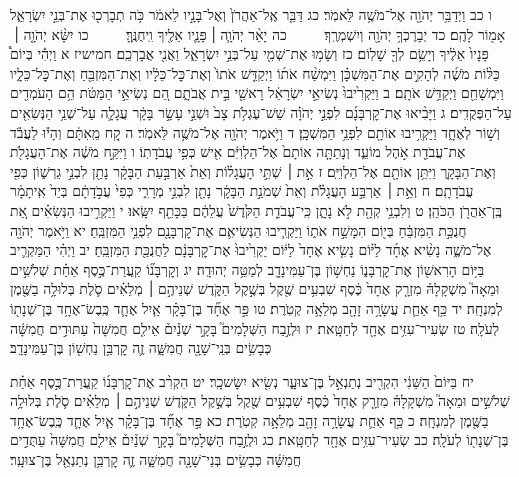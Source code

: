 \documentclass[twoside, openany, parskip=half, 11pt]{book}
\begin{document}
ו כב וַיְדַבֵּ֥ר יְהֹוָ֖ה אֶל־מֹשֶׁ֥ה לֵּאמֹֽר׃ כג דַּבֵּ֤ר אֶֽל־אַהֲרֹן֙ וְאֶל־בָּנָ֣יו לֵאמֹ֔ר כֹּ֥ה תְבָרְכ֖וּ אֶת־בְּנֵ֣י יִשְׂרָאֵ֑ל אָמ֖וֹר לָהֶֽם׃
כד יְבָרֶכְךָ֥ יְהֹוָ֖ה וְיִשְׁמְרֶֽךָ׃    כה יָאֵ֨ר יְהֹוָ֧ה ׀ פָּנָ֛יו אֵלֶ֖יךָ וִֽיחֻנֶּֽךָּ׃    כו יִשָּׂ֨א יְהֹוָ֤ה ׀ פָּנָיו֙ אֵלֶ֔יךָ וְיָשֵׂ֥ם לְךָ֖ שָׁלֽוֹם׃
כז וְשָׂמ֥וּ אֶת־שְׁמִ֖י עַל־בְּנֵ֣י יִשְׂרָאֵ֑ל וַאֲנִ֖י אֲבָרְכֵֽם׃
חמישיז א וַיְהִ֡י בְּיוֹם֩ כַּלּ֨וֹת מֹשֶׁ֜ה לְהָקִ֣ים אֶת־הַמִּשְׁכָּ֗ן וַיִּמְשַׁ֨ח אֹת֜וֹ וַיְקַדֵּ֤שׁ אֹתוֹ֙ וְאֶת־כׇּל־כֵּלָ֔יו וְאֶת־הַמִּזְבֵּ֖חַ וְאֶת־כׇּל־כֵּלָ֑יו וַיִּמְשָׁחֵ֖ם וַיְקַדֵּ֥שׁ אֹתָֽם׃ ב וַיַּקְרִ֙יבוּ֙ נְשִׂיאֵ֣י יִשְׂרָאֵ֔ל רָאשֵׁ֖י בֵּ֣ית אֲבֹתָ֑ם הֵ֚ם נְשִׂיאֵ֣י הַמַּטֹּ֔ת הֵ֥ם הָעֹמְדִ֖ים עַל־הַפְּקֻדִֽים׃ ג וַיָּבִ֨יאוּ אֶת־קׇרְבָּנָ֜ם לִפְנֵ֣י יְהֹוָ֗ה שֵׁשׁ־עֶגְלֹ֥ת צָב֙ וּשְׁנֵ֣י עָשָׂ֣ר בָּקָ֔ר עֲגָלָ֛ה עַל־שְׁנֵ֥י הַנְּשִׂאִ֖ים וְשׁ֣וֹר לְאֶחָ֑ד וַיַּקְרִ֥יבוּ אוֹתָ֖ם לִפְנֵ֥י הַמִּשְׁכָּֽן׃ ד וַיֹּ֥אמֶר יְהֹוָ֖ה אֶל־מֹשֶׁ֥ה לֵּאמֹֽר׃ ה קַ֚ח מֵֽאִתָּ֔ם וְהָי֕וּ לַעֲבֹ֕ד אֶת־עֲבֹדַ֖ת אֹ֣הֶל מוֹעֵ֑ד וְנָתַתָּ֤ה אוֹתָם֙ אֶל־הַלְוִיִּ֔ם אִ֖ישׁ כְּפִ֥י עֲבֹדָתֽוֹ׃ ו וַיִּקַּ֣ח מֹשֶׁ֔ה אֶת־הָעֲגָלֹ֖ת וְאֶת־הַבָּקָ֑ר וַיִּתֵּ֥ן אוֹתָ֖ם אֶל־הַלְוִיִּֽם׃ ז אֵ֣ת ׀ שְׁתֵּ֣י הָעֲגָל֗וֹת וְאֵת֙ אַרְבַּ֣עַת הַבָּקָ֔ר נָתַ֖ן לִבְנֵ֣י גֵרְשׁ֑וֹן כְּפִ֖י עֲבֹדָתָֽם׃ ח וְאֵ֣ת ׀ אַרְבַּ֣ע הָעֲגָלֹ֗ת וְאֵת֙ שְׁמֹנַ֣ת הַבָּקָ֔ר נָתַ֖ן לִבְנֵ֣י מְרָרִ֑י כְּפִי֙ עֲבֹ֣דָתָ֔ם בְּיַד֙ אִֽיתָמָ֔ר בֶּֽן־אַהֲרֹ֖ן הַכֹּהֵֽן׃ ט וְלִבְנֵ֥י קְהָ֖ת לֹ֣א נָתָ֑ן כִּֽי־עֲבֹדַ֤ת הַקֹּ֙דֶשׁ֙ עֲלֵהֶ֔ם בַּכָּתֵ֖ף יִשָּֽׂאוּ׃ י וַיַּקְרִ֣יבוּ הַנְּשִׂאִ֗ים אֵ֚ת חֲנֻכַּ֣ת הַמִּזְבֵּ֔חַ בְּי֖וֹם הִמָּשַׁ֣ח אֹת֑וֹ וַיַּקְרִ֧יבוּ הַנְּשִׂיאִ֛ם אֶת־קׇרְבָּנָ֖ם לִפְנֵ֥י הַמִּזְבֵּֽחַ׃ יא וַיֹּ֥אמֶר יְהֹוָ֖ה אֶל־מֹשֶׁ֑ה נָשִׂ֨יא אֶחָ֜ד לַיּ֗וֹם נָשִׂ֤יא אֶחָד֙ לַיּ֔וֹם יַקְרִ֙יבוּ֙ אֶת־קׇרְבָּנָ֔ם לַחֲנֻכַּ֖ת הַמִּזְבֵּֽחַ׃
יב וַיְהִ֗י הַמַּקְרִ֛יב בַּיּ֥וֹם הָרִאשׁ֖וֹן אֶת־קׇרְבָּנ֑וֹ נַחְשׁ֥וֹן בֶּן־עַמִּינָדָ֖ב לְמַטֵּ֥ה יְהוּדָֽה׃ יג וְקׇרְבָּנ֞וֹ קַֽעֲרַת־כֶּ֣סֶף אַחַ֗ת שְׁלֹשִׁ֣ים וּמֵאָה֮ מִשְׁקָלָהּ֒ מִזְרָ֤ק אֶחָד֙ כֶּ֔סֶף שִׁבְעִ֥ים שֶׁ֖קֶל בְּשֶׁ֣קֶל הַקֹּ֑דֶשׁ שְׁנֵיהֶ֣ם ׀ מְלֵאִ֗ים סֹ֛לֶת בְּלוּלָ֥ה בַשֶּׁ֖מֶן לְמִנְחָֽה׃ יד כַּ֥ף אַחַ֛ת עֲשָׂרָ֥ה זָהָ֖ב מְלֵאָ֥ה קְטֹֽרֶת׃ טו פַּ֣ר אֶחָ֞ד בֶּן־בָּקָ֗ר אַ֧יִל אֶחָ֛ד כֶּֽבֶשׂ־אֶחָ֥ד בֶּן־שְׁנָת֖וֹ לְעֹלָֽה׃ טז שְׂעִיר־עִזִּ֥ים אֶחָ֖ד לְחַטָּֽאת׃ יז וּלְזֶ֣בַח הַשְּׁלָמִים֮ בָּקָ֣ר שְׁנַ֒יִם֒ אֵילִ֤ם חֲמִשָּׁה֙ עַתּוּדִ֣ים חֲמִשָּׁ֔ה כְּבָשִׂ֥ים בְּנֵֽי־שָׁנָ֖ה חֲמִשָּׁ֑ה זֶ֛ה קׇרְבַּ֥ן נַחְשׁ֖וֹן בֶּן־עַמִּינָדָֽב׃

יח בַּיּוֹם֙ הַשֵּׁנִ֔י הִקְרִ֖יב נְתַנְאֵ֣ל בֶּן־צוּעָ֑ר נְשִׂ֖יא יִשָּׂשכָֽר׃ יט הִקְרִ֨ב אֶת־קׇרְבָּנ֜וֹ קַֽעֲרַת־כֶּ֣סֶף אַחַ֗ת שְׁלֹשִׁ֣ים וּמֵאָה֮ מִשְׁקָלָהּ֒ מִזְרָ֤ק אֶחָד֙ כֶּ֔סֶף שִׁבְעִ֥ים שֶׁ֖קֶל בְּשֶׁ֣קֶל הַקֹּ֑דֶשׁ שְׁנֵיהֶ֣ם ׀ מְלֵאִ֗ים סֹ֛לֶת בְּלוּלָ֥ה בַשֶּׁ֖מֶן לְמִנְחָֽה׃ כ כַּ֥ף אַחַ֛ת עֲשָׂרָ֥ה זָהָ֖ב מְלֵאָ֥ה קְטֹֽרֶת׃ כא פַּ֣ר אֶחָ֞ד בֶּן־בָּקָ֗ר אַ֧יִל אֶחָ֛ד כֶּֽבֶשׂ־אֶחָ֥ד בֶּן־שְׁנָת֖וֹ לְעֹלָֽה׃ כב שְׂעִיר־עִזִּ֥ים אֶחָ֖ד לְחַטָּֽאת׃ כג וּלְזֶ֣בַח הַשְּׁלָמִים֮ בָּקָ֣ר שְׁנַ֒יִם֒ אֵילִ֤ם חֲמִשָּׁה֙ עַתֻּדִ֣ים חֲמִשָּׁ֔ה כְּבָשִׂ֥ים בְּנֵי־שָׁנָ֖ה חֲמִשָּׁ֑ה זֶ֛ה קׇרְבַּ֥ן נְתַנְאֵ֖ל בֶּן־צוּעָֽר׃
\end{document}
